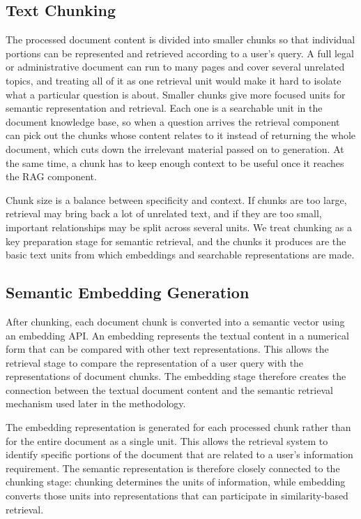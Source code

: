 \documentclass[12pt,a4paper,oneside]{report}
\begin{document}
\subsection{Text Chunking}

The processed document content is divided into smaller chunks so that
individual portions can be represented and retrieved according to a user's
query. A full legal or administrative document can run to many pages and cover several unrelated topics, and treating all of it as one retrieval unit would make it hard to isolate what a particular question is about. Smaller chunks give more focused units for semantic representation and retrieval. Each one is a searchable unit in the document knowledge base, so when a question arrives the retrieval component can pick out the chunks whose content relates to it instead of returning the whole document, which cuts down the irrelevant material passed on to generation. At the same time, a chunk has to keep enough context to be useful once it reaches the RAG component.

Chunk size is a balance between specificity and context. If chunks are too large, retrieval may bring back a lot of unrelated text, and if they are too small, important relationships may be split across several units. We treat chunking as a key preparation stage for semantic retrieval, and the chunks it produces are the basic text units from which embeddings and searchable representations are made.

\subsection{Semantic Embedding Generation}

After chunking, each document chunk is converted into a semantic vector
using an embedding API. An embedding represents the textual content in a
numerical form that can be compared with other text representations. This
allows the retrieval stage to compare the representation of a user query
with the representations of document chunks. The embedding stage therefore
creates the connection between the textual document content and the
semantic retrieval mechanism used later in the methodology.

The embedding representation is generated for each processed chunk rather
than for the entire document as a single unit. This allows the retrieval
system to identify specific portions of the document that are related to a
user's information requirement. The semantic representation is therefore
closely connected to the chunking stage: chunking determines the units of
information, while embedding converts those units into representations that
can participate in similarity-based retrieval.
\end{document}
